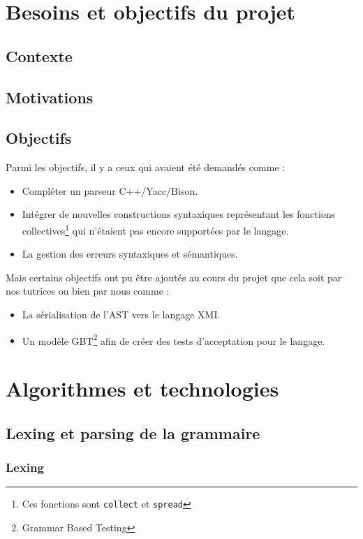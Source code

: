 \documentclass[a4paper, 11pt]{article}
\newcommand{\prog}[1]{\texttt{#1}}
\begin{document}
\section{Besoins et objectifs du projet}

\subsection{Contexte}

\subsection{Motivations}

\subsection{Objectifs}

Parmi les objectifs, il y a ceux qui avaient été demandés comme :
\begin{itemize}
    \item Compléter un parseur C++/Yacc/Bison.
    \item Intégrer de nouvelles constructions syntaxiques représentant les fonctions collectives\footnote{Ces fonctions sont \prog{collect} et \prog{spread}} qui n'étaient pas encore supportées par le langage.
    \item La gestion des erreurs syntaxiques et sémantiques.
\end{itemize} 

Mais certains objectifs ont pu être ajoutés au cours du projet que cela soit par nos tutrices ou bien par nous comme :
\begin{itemize}
    \item La sérialisation de l'AST vers le langage XMI.
    \item Un modèle GBT\footnote{Grammar Based Testing} afin de créer des tests d'acceptation pour le langage.
\end{itemize}

\section{Algorithmes et technologies}

\subsection{Lexing et parsing de la grammaire}

\subsubsection{Lexing}
\end{document}
